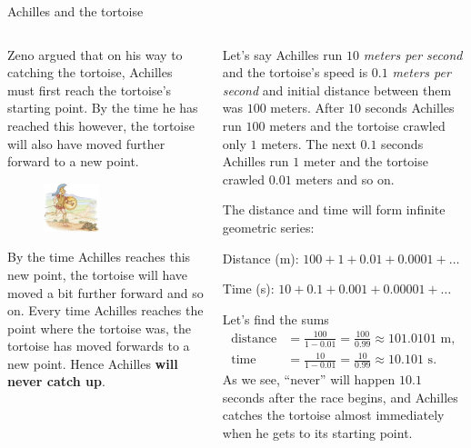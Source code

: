 \documentclass[9pt,aspectratio=169]{beamer}
\begin{document}
\begin{frame}{Achilles and the tortoise}
\begin{columns}[T]
\begin{column}{0.5\textwidth}
      Zeno argued that on his way to catching the tortoise, Achilles must first reach the tortoise’s starting point. By the time he has reached this however, the tortoise will also have moved further forward to a new point. 
      \begin{figure}
        \vspace*{-2em}
        \hspace*{-1.3em}
        \includegraphics[width=0.45\textwidth]{07 - Geometric Sequences/zeno.jpg}
      \end{figure}
      By the time Achilles reaches this new point, the tortoise will have moved a bit further forward and so on. Every time Achilles reaches the point where the tortoise was, the tortoise has moved forwards to a new point. Hence Achilles \textbf{will never catch up}.
    \end{column}
    \begin{column}{0.5\textwidth}
      Let’s say Achilles run $10$ \emph{meters per second} and the tortoise’s speed is $0.1$ \emph{meters per second} and initial distance between them was $100$ meters. After $10$ seconds Achilles run $100$ meters and the tortoise crawled only $1$ meters. The next $0.1$ seconds Achilles run $1$ meter and the tortoise crawled $0.01$ meters and so on. 
      
      The distance and time will form infinite geometric series:
      
      Distance (m): $100 + 1 + 0.01 + 0.0001 + \ldots$
      
      Time (s): $10 + 0.1 + 0.001 + 0.00001 + \ldots$
      
      Let’s find the sums
      \begin{align*}
        \text{distance} &= \frac{100}{1 - 0.01} = \frac{100}{0.99} \approx 101.0101 \text{ m}, \\
        \text{time} &= \frac{10}{1 - 0.01} = \frac{10}{0.99} \approx 10.101 \text{ s}.
      \end{align*}
      As we see, “never” will happen $10.1$ seconds after the race begins, and Achilles catches the tortoise almost immediately when he gets to its starting point.
    \end{column}
  \end{columns}
\end{frame}
\end{document}
